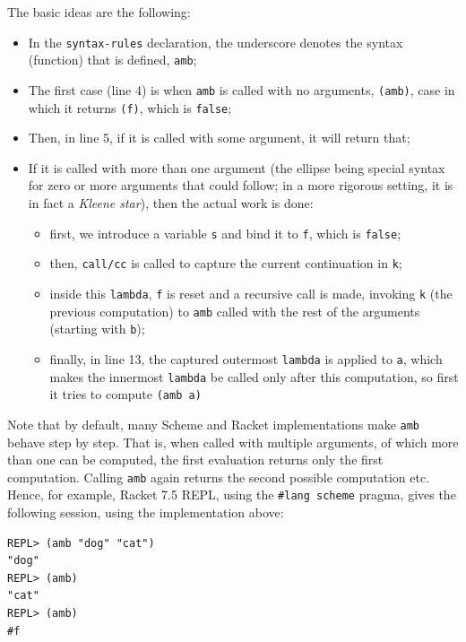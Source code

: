 The basic ideas are the following:
\begin{itemize}
\item In the \texttt{syntax-rules} declaration, the underscore denotes
  the syntax (function) that is defined, \texttt{amb};
\item The first case (line 4) is when \texttt{amb} is called with no arguments,
  \texttt{(amb)}, case in which it returns \texttt{(f)}, which is \texttt{false};
\item Then, in line 5, if it is called with some argument, it will return that;
\item If it is called with more than one argument (the ellipse being special
  syntax for zero or more arguments that could follow; in a more rigorous setting,
  it is in fact a \emph{Kleene star}), then the actual work is done:
  \begin{itemize}
  \item first, we introduce a variable \texttt{s} and bind it to \texttt{f}, which is
    \texttt{false};
  \item then, \texttt{call/cc} is called to capture the current continuation in \texttt{k};
  \item inside this \texttt{lambda}, \texttt{f} is reset and a recursive call is made,
    invoking \texttt{k} (the previous computation) to \texttt{amb} called with the rest
    of the arguments (starting with \texttt{b});
  \item finally, in line 13, the captured outermost \texttt{lambda} is applied to \texttt{a},
    which makes the innermost \texttt{lambda} be called only after this computation, so
    first it tries to compute \texttt{(amb a)}
  \end{itemize}
\end{itemize}

\begin{remark}\label{rk:first-res}
  Note that by default, many Scheme and Racket implementations make \texttt{amb}
  behave step by step. That is, when called with multiple arguments, of which more
  than one can be computed, the first evaluation returns only the first computation.
  Calling \texttt{amb} again returns the second possible computation etc.
  Hence, for example, Racket 7.5 REPL, using the \texttt{\#lang scheme} pragma,
  gives the following session, using the implementation above:
  {
    \small
\begin{verbatim}
REPL> (amb "dog" "cat")
"dog"
REPL> (amb)
"cat"
REPL> (amb)
#f
\end{verbatim}
  }
\end{remark}

